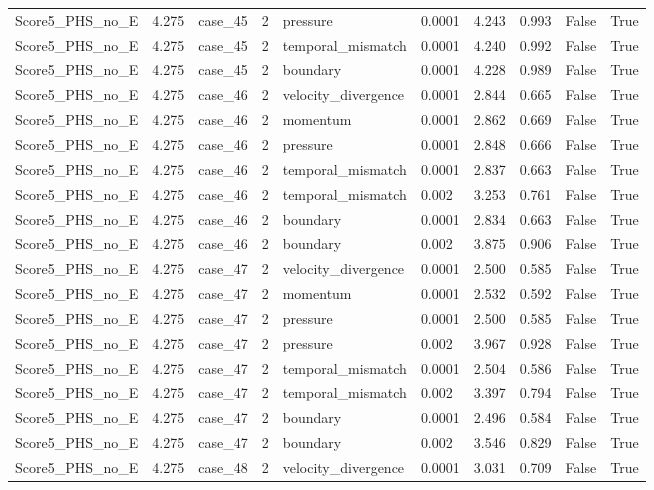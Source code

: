 \begin{longtable}{llllllllll}
Score5\_PHS\_no\_E & 4.275 & case\_45 & 2 & pressure & 0.0001 & 4.243 & 0.993 & False & True \\
Score5\_PHS\_no\_E & 4.275 & case\_45 & 2 & temporal\_mismatch & 0.0001 & 4.240 & 0.992 & False & True \\
Score5\_PHS\_no\_E & 4.275 & case\_45 & 2 & boundary & 0.0001 & 4.228 & 0.989 & False & True \\
Score5\_PHS\_no\_E & 4.275 & case\_46 & 2 & velocity\_divergence & 0.0001 & 2.844 & 0.665 & False & True \\
Score5\_PHS\_no\_E & 4.275 & case\_46 & 2 & momentum & 0.0001 & 2.862 & 0.669 & False & True \\
Score5\_PHS\_no\_E & 4.275 & case\_46 & 2 & pressure & 0.0001 & 2.848 & 0.666 & False & True \\
Score5\_PHS\_no\_E & 4.275 & case\_46 & 2 & temporal\_mismatch & 0.0001 & 2.837 & 0.663 & False & True \\
Score5\_PHS\_no\_E & 4.275 & case\_46 & 2 & temporal\_mismatch & 0.002 & 3.253 & 0.761 & False & True \\
Score5\_PHS\_no\_E & 4.275 & case\_46 & 2 & boundary & 0.0001 & 2.834 & 0.663 & False & True \\
Score5\_PHS\_no\_E & 4.275 & case\_46 & 2 & boundary & 0.002 & 3.875 & 0.906 & False & True \\
Score5\_PHS\_no\_E & 4.275 & case\_47 & 2 & velocity\_divergence & 0.0001 & 2.500 & 0.585 & False & True \\
Score5\_PHS\_no\_E & 4.275 & case\_47 & 2 & momentum & 0.0001 & 2.532 & 0.592 & False & True \\
Score5\_PHS\_no\_E & 4.275 & case\_47 & 2 & pressure & 0.0001 & 2.500 & 0.585 & False & True \\
Score5\_PHS\_no\_E & 4.275 & case\_47 & 2 & pressure & 0.002 & 3.967 & 0.928 & False & True \\
Score5\_PHS\_no\_E & 4.275 & case\_47 & 2 & temporal\_mismatch & 0.0001 & 2.504 & 0.586 & False & True \\
Score5\_PHS\_no\_E & 4.275 & case\_47 & 2 & temporal\_mismatch & 0.002 & 3.397 & 0.794 & False & True \\
Score5\_PHS\_no\_E & 4.275 & case\_47 & 2 & boundary & 0.0001 & 2.496 & 0.584 & False & True \\
Score5\_PHS\_no\_E & 4.275 & case\_47 & 2 & boundary & 0.002 & 3.546 & 0.829 & False & True \\
Score5\_PHS\_no\_E & 4.275 & case\_48 & 2 & velocity\_divergence & 0.0001 & 3.031 & 0.709 & False & True \\

\end{longtable}
